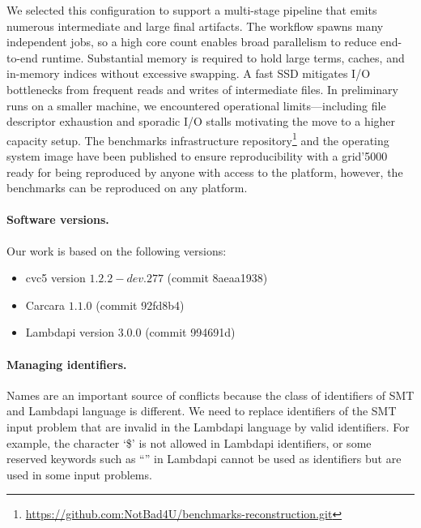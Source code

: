 We selected this configuration to support a multi-stage pipeline that emits numerous intermediate and large final artifacts.
The workflow spawns many independent jobs, so a high core count enables broad parallelism to reduce end-to-end runtime.
Substantial memory is required to hold large terms, caches, and in-memory indices without excessive swapping.
A fast SSD mitigates I/O bottlenecks from frequent reads and writes of intermediate files.
In preliminary runs on a smaller machine, we encountered operational limits—including file descriptor exhaustion and sporadic I/O stalls motivating the move to a higher capacity setup.
The benchmarks infrastructure repository\footnote{\url{https://github.com:NotBad4U/benchmarks-reconstruction.git}} and the operating system image have been published  to ensure reproducibility with a {grid'5000} ready for being reproduced by anyone with access to the platform, however, the benchmarks can be reproduced on any platform.

\paragraph{Software versions.} Our work is based on the following versions:
\begin{itemize} 
  \item cvc5 version $1.2.2-dev.277$ (commit 8aeaa1938)
  \item Carcara $1.1.0$ (commit 92fd8b4)
  \item Lambdapi version $3.0.0$ (commit 994691d)
\end{itemize}

\paragraph{Managing identifiers.} Names are an important source of conflicts because the class of identifiers
of SMT and Lambdapi language is different. We need to replace identifiers of the SMT input problem that are
invalid in the Lambdapi language by valid identifiers. For example, the character `\$' is not allowed in Lambdapi identifiers,
or some reserved keywords such as ``'' in Lambdapi cannot be used as identifiers but are used in some input problems.

